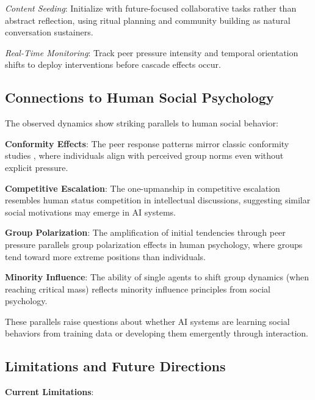 \documentclass[11pt,letterpaper]{article}
\begin{document}
\textit{Content Seeding}: Initialize with future-focused collaborative tasks rather than abstract reflection, using ritual planning and community building as natural conversation sustainers.

\textit{Real-Time Monitoring}: Track peer pressure intensity and temporal orientation shifts to deploy interventions before cascade effects occur.

\subsection{Connections to Human Social Psychology}

The observed dynamics show striking parallels to human social behavior:

\textbf{Conformity Effects}: The peer response patterns mirror classic conformity studies \citep{asch1956studies}, where individuals align with perceived group norms even without explicit pressure.

\textbf{Competitive Escalation}: The one-upmanship in competitive escalation resembles human status competition in intellectual discussions, suggesting similar social motivations may emerge in AI systems.

\textbf{Group Polarization}: The amplification of initial tendencies through peer pressure parallels group polarization effects in human psychology, where groups tend toward more extreme positions than individuals.

\textbf{Minority Influence}: The ability of single agents to shift group dynamics (when reaching critical mass) reflects minority influence principles from social psychology.

These parallels raise questions about whether AI systems are learning social behaviors from training data or developing them emergently through interaction.

\subsection{Limitations and Future Directions}

\textbf{Current Limitations}:
\end{document}
